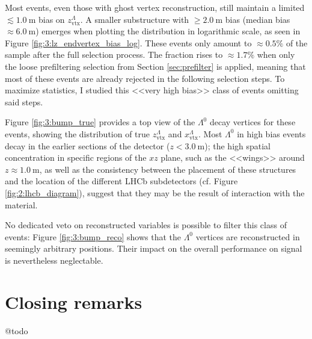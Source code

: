 Most \demonstratorshort events, even those with ghost vertex reconstruction, still maintain a limited $\lesssim \SI{1.0}{\meter}$ bias on $z_\text{vtx}^\Lambda$.
A smaller substructure with $\geq \SI{2.0}{\meter}$ bias (median bias $\approx \SI{6.0}{\meter}$) emerges when plotting the distribution in logarithmic scale, as seen in Figure \ref{fig:3:lz_endvertex_bias_log}.
These events only amount to $\approx 0.5\%$ of the sample after the full selection process.
The fraction rises to $\approx 1.7\%$ when only the loose prefiltering selection from Section \ref{sec:prefilter} is applied, meaning that most of these events are already rejected in the following selection steps.
To maximize statistics, I studied this <<very high bias>> class of events omitting said steps.

Figure \ref{fig:3:bump_true} provides a top view of the $\Lambda^0$ decay vertices for these events, showing the distribution of true $z_\text{vtx}^\Lambda$ and $x_\text{vtx}^\Lambda$.
Most $\Lambda^0$ in high bias events decay in the earlier sections of the detector ($z<\SI{3.0}{\meter}$);
the high spatial concentration in specific regions of the $xz$ plane, such as the <<wings>> around $z\approx \SI{1.0}{\meter}$, as well as the consistency between the placement of these structures and the location of the different LHCb subdetectors (cf. Figure \ref{fig:2:lhcb_diagram}), suggest that they may be the result of interaction with the material.

No dedicated veto on reconstructed variables is possible to filter this class of events:
Figure \ref{fig:3:bump_reco} shows that the $\Lambda^0$ vertices are reconstructed in seemingly arbitrary positions.
Their impact on the overall performance on signal is nevertheless neglectable.

\section{Closing remarks}

@todo